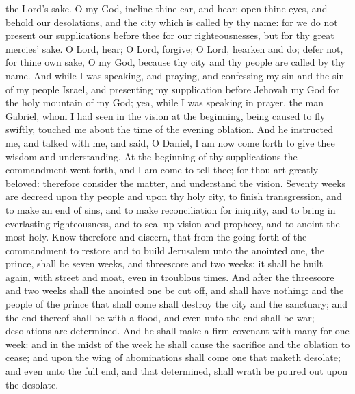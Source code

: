 the Lord’s sake. O my God, incline thine ear, and hear; open thine eyes, and behold our desolations, and the city which is called by thy name: for we do not present our supplications before thee for our righteousnesses, but for thy great mercies’ sake. O Lord, hear; O Lord, forgive; O Lord, hearken and do; defer not, for thine own sake, O my God, because thy city and thy people are called by thy name.  And while I was speaking, and praying, and confessing my sin and the sin of my people Israel, and presenting my supplication before Jehovah my God for the holy mountain of my God; yea, while I was speaking in prayer, the man Gabriel, whom I had seen in the vision at the beginning, being caused to fly swiftly, touched me about the time of the evening oblation. And he instructed me, and talked with me, and said, O Daniel, I am now come forth to give thee wisdom and understanding. At the beginning of thy supplications the commandment went forth, and I am come to tell thee; for thou art greatly beloved: therefore consider the matter, and understand the vision.  Seventy weeks are decreed upon thy people and upon thy holy city, to finish transgression, and to make an end of sins, and to make reconciliation for iniquity, and to bring in everlasting righteousness, and to seal up vision and prophecy, and to anoint the most holy. Know therefore and discern, that from the going forth of the commandment to restore and to build Jerusalem unto the anointed one, the prince, shall be seven weeks, and threescore and two weeks: it shall be built again, with street and moat, even in troublous times. And after the threescore and two weeks shall the anointed one be cut off, and shall have nothing: and the people of the prince that shall come shall destroy the city and the sanctuary; and the end thereof shall be with a flood, and even unto the end shall be war; desolations are determined. And he shall make a firm covenant with many for one week: and in the midst of the week he shall cause the sacrifice and the oblation to cease; and upon the wing of abominations shall come one that maketh desolate; and even unto the full end, and that determined, shall wrath be poured out upon the desolate. 

